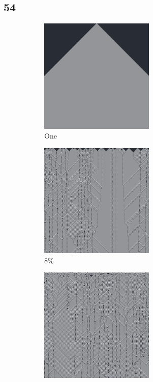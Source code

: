 \documentclass[12pt, fleqn]{report}                             %
\theoremstyle{break}                                            %
\begin{document}
      \subsection{54}
      \begin{figure}[ht!]
        \centering
        \begin{subfigure}[b]{0.4\linewidth}
          \includegraphics[width=0.6\textwidth]{Images/54/a.png}
          \caption{One}
        \end{subfigure}
        \begin{subfigure}[b]{0.4\linewidth}
          \includegraphics[width=0.6\textwidth]{Images/54/b.png}
          \caption{8\%}
        \end{subfigure}
        \begin{subfigure}[b]{0.4\linewidth}
          \includegraphics[width=0.6\textwidth]{Images/54/c.png}

\end{subfigure}
\end{figure}
\end{document}
